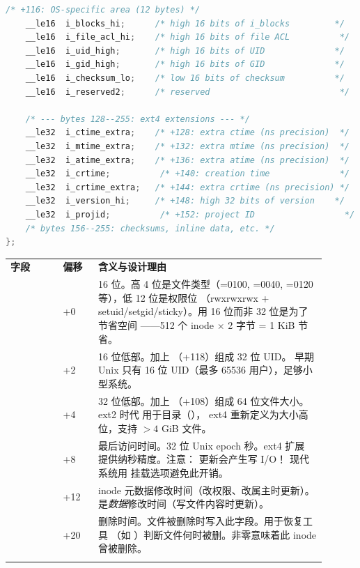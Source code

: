 \begin{filesystemlayout}
\begin{lstlisting}[language=C]
    /* +116: OS-specific area (12 bytes) */
    __le16  i_blocks_hi;      /* high 16 bits of i_blocks         */
    __le16  i_file_acl_hi;    /* high 16 bits of file ACL          */
    __le16  i_uid_high;       /* high 16 bits of UID              */
    __le16  i_gid_high;       /* high 16 bits of GID              */
    __le16  i_checksum_lo;    /* low 16 bits of checksum          */
    __le16  i_reserved2;      /* reserved                          */

    /* --- bytes 128--255: ext4 extensions --- */
    __le32  i_ctime_extra;    /* +128: extra ctime (ns precision)  */
    __le32  i_mtime_extra;    /* +132: extra mtime (ns precision)  */
    __le32  i_atime_extra;    /* +136: extra atime (ns precision)  */
    __le32  i_crtime;          /* +140: creation time              */
    __le32  i_crtime_extra;   /* +144: extra crtime (ns precision) */
    __le32  i_version_hi;     /* +148: high 32 bits of version    */
    __le32  i_projid;          /* +152: project ID                  */
    /* bytes 156--255: checksums, inline data, etc. */
};
\end{lstlisting}


\begin{longtable}{|F{0.15\linewidth}|F{0.10\linewidth}|F{0.65\linewidth}|}
\hline
{}
\textbf{字段} & \textbf{偏移} & \textbf{含义与设计理由} \\\tablerowrule
\endhead
{} & +0 & 16 位。高 4 位是文件类型（=0100,
=0040, =0120 等），低 12 位是权限位
（rwxrwxrwx + setuid/setgid/sticky）。用 16 位而非 32 位是为了节省空间
——512 个 inode $\times$ 2 字节 = 1 KiB 节省。 \\\tablerowrule
{} & +2 & 16 位低部。加上 （+118）组成 32 位 UID。
早期 Unix 只有 16 位 UID（最多 65536 用户），足够小型系统。 \\\tablerowrule
{} & +4 & 32 位低部。加上 （+108）组成
64 位文件大小。ext2 时代  用于目录（），
ext4 重新定义为大小高位，支持 $> 4$ GiB 文件。 \\\tablerowrule
{} & +8 & 最后访问时间。32 位 Unix epoch 秒。ext4 扩展
 提供纳秒精度。注意： 更新会产生写 I/O！
现代系统用  挂载选项避免此开销。 \\\tablerowrule
{} & +12 & inode 元数据修改时间（改权限、改属主时更新）。
 是\emph{数据}修改时间（写文件内容时更新）。 \\\tablerowrule
{} & +20 & 删除时间。文件被删除时写入此字段。用于恢复工具
（如 ）判断文件何时被删。非零意味着此 inode 曾被删除。 \\\tablerowrule
\end{longtable}


\end{filesystemlayout}
